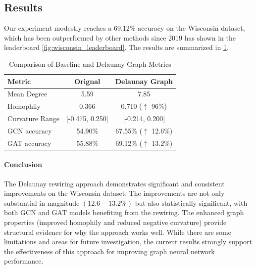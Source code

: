 \documentclass{article}
\theoremstyle{plain}
\theoremstyle{definition}
\theoremstyle{remark}
\begin{document}
\subsection{Results}
Our experiment modestly reaches a 69.12\% accuracy on the Wisconsin dataset,
which has been outperformed by other methods since 2019 has shown in the leaderboard \cref{fig:wisconsin_leaderboard}.
The results are summarized in \cref{tab:graph_comparison}.
\begin{table}[h!]
    \caption{Comparison of Baseline and Delaunay Graph Metrics}
    \centering
    \begin{tabular}{|l|c|c|}
    \hline
    \textbf{Metric}          & \textbf{Orignal} & \textbf{Delaunay Graph} \\ \hline
    Mean Degree              & 5.59                   & 7.85               \\ \hline
    Homophily                & 0.366                  & 0.710 ($\uparrow$ 96\%) \\ \hline
    Curvature Range          & [-0.475, 0.250]        & [-0.214, 0.200]         \\ \hline
    GCN accuracy             & 54.90\%                & 67.55\% ($\uparrow$ 12.6\%)       \\ \hline
    GAT accuracy             & 55.88\%                & 69.12\% ($\uparrow$ 13.2\%)       \\ \hline
    \end{tabular}
    \label{tab:graph_comparison}
    \end{table}


\paragraph{Conclusion}
The Delaunay rewiring approach demonstrates significant and consistent improvements
 on the Wisconsin dataset. The improvements are not only substantial in magnitude 
 $(12.6-13.2\%)$ but also statistically significant, with both GCN and GAT models
 benefiting from the rewiring. The enhanced graph properties (improved homophily 
 and reduced negative curvature) provide structural evidence for why the approach 
 works well. While there are some limitations and areas for future investigation, 
 the current results strongly support the effectiveness of this approach for 
 improving graph neural network performance.



    
    
\end{document}
